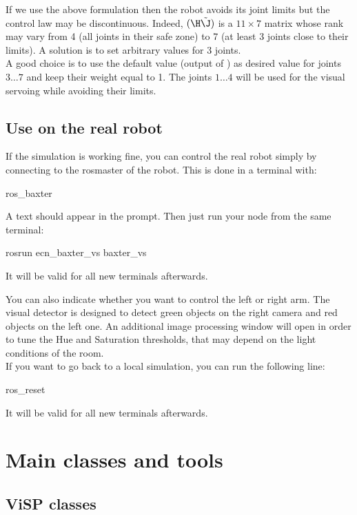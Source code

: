 \documentclass{ecnreport}
\begin{document}
If we use the above formulation then the robot avoids its joint limits but the control law may be discontinuous. Indeed, $(\H\tilde\J)$ is a $11\times 7$ matrix whose rank may vary from 4 (all joints in their safe zone) to 7 (at least 3 joints close to their limits). A solution is to set arbitrary values for 3 joints. \\

A good choice is to use the default value (output of ) as desired value for joints $3\hdots7$ and keep their weight equal to 1.
The joints $1\hdots 4$ will be used for the visual servoing while avoiding their limits.

\subsection{Use on the real robot}

If the simulation is working fine, you can control the real robot simply by connecting to the rosmaster of the robot. This is done in a terminal with:
\begin{bashcodelarge}
 ros_baxter
\end{bashcodelarge}A \okt{[baxter]} text should appear in the prompt.
Then just run your node from the same terminal:
\begin{bashcodelarge}
 rosrun ecn_baxter_vs baxter_vs
\end{bashcodelarge} It will be valid for all new terminals afterwards.

You can also indicate whether you want to control the left or right arm. The visual detector is designed to detect green objects on the right camera and red objects on the left one. An additional image processing window will open in order to tune the Hue and Saturation thresholds, that may depend on the light conditions of the room.\\

If you want to go back to a local simulation, you can run the following line:
\begin{bashcodelarge}
 ros_reset
\end{bashcodelarge} It will be valid for all new terminals afterwards.


\appendix

\section{Main classes and tools}\label{sec:classes}

\subsection{ViSP classes}
\end{document}

